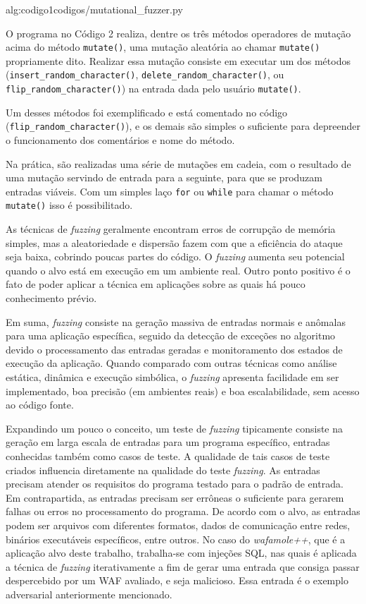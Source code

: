  {alg:codigo1}{codigos/mutational_fuzzer.py}

\bigskip
O programa no Código 2 realiza, dentre os três métodos operadores de mutação acima do método \verb+mutate()+, uma mutação aleatória ao chamar \verb+mutate()+ propriamente dito. Realizar essa mutação consiste em executar um dos métodos (\verb+insert_random_character()+, \verb+delete_random_character()+, ou \verb+flip_random_character()+)  na entrada dada pelo usuário  \verb+mutate()+. 

Um desses métodos foi exemplificado e está comentado no código \linebreak (\verb+flip_random_character()+), e os demais são simples o suficiente para depreender o funcionamento dos comentários e nome do método.

Na prática, são realizadas uma série de mutações em cadeia, com o resultado de uma mutação servindo de entrada para a seguinte, para que se produzam entradas viáveis. Com um simples laço \verb+for+ ou \verb+while+ para chamar o método \verb+mutate()+ isso é possibilitado.

As técnicas de \textit{fuzzing} geralmente encontram erros de corrupção de memória simples, mas a aleatoriedade e dispersão fazem com que a eficiência do ataque seja baixa, cobrindo poucas partes do código. O \textit{fuzzing} aumenta seu potencial quando o alvo está em execução em um ambiente real. Outro ponto positivo é o fato de poder aplicar a técnica em aplicações sobre as quais há pouco conhecimento prévio.

Em suma, \textit{fuzzing} consiste na geração massiva de entradas normais e anômalas para uma aplicação específica, seguido da detecção de exceções no algoritmo devido o processamento das entradas geradas e monitoramento dos estados de execução da aplicação. Quando comparado com outras técnicas como análise estática, dinâmica e execução simbólica, o \textit{fuzzing} apresenta facilidade em ser implementado, boa precisão (em ambientes reais) e boa escalabilidade, sem acesso ao código fonte.

Expandindo um pouco o conceito, um teste de \textit{fuzzing} tipicamente consiste na geração em larga escala de entradas para um programa específico, entradas conhecidas também como casos de teste. A qualidade de tais casos de teste criados influencia diretamente na qualidade do teste \textit{fuzzing}. As entradas precisam atender os requisitos do programa testado para o padrão de entrada. Em contrapartida, as entradas precisam ser errôneas o suficiente para gerarem falhas ou erros no processamento do programa. De acordo com o alvo, as entradas podem ser arquivos com diferentes formatos, dados de comunicação entre redes, binários executáveis específicos, entre outros. No caso do \textit{wafamole++}, que é a aplicação alvo deste trabalho, trabalha-se com injeções SQL, nas quais é aplicada a técnica de \textit{fuzzing} iterativamente a fim de gerar uma entrada que consiga passar despercebido por um WAF avaliado, e seja malicioso. Essa entrada é o exemplo adversarial anteriormente mencionado.

